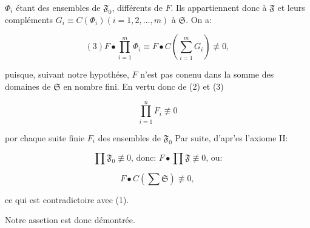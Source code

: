 \documentclass[12pt,french]{article}
\begin{document}
$\Phi_i$ \'etant des ensembles de $\mathfrak{F}_0$, diff\'erents de $F$. Ils appartiennent donc \`a $\mathfrak{F}$ et leurs compl\'ements $G_i \equiv C(\Phi_i) (i=1,2,...,m)$ \`a $\mathfrak{S}$. On a:

$$(3) F \bullet \prod_{i=1}^{m}\Phi_i \equiv F\bullet{}C(\sum_{i=1}^{m}G_i) \not\equiv 0,$$

puisque, suivant notre hypoth\'ese, $F$ n'est pas conenu dans la somme des domaines de $\mathfrak{S}$ en nombre fini. En vertu donc de (2) et (3)

$$\prod_{i=1}^{n}F_i \not\equiv{}0$$

por chaque suite finie $F_i$ des ensembles de $\mathfrak{F}_0$ Par suite, d'apr'es l'axiome II:


$$\prod\mathfrak{F}_0\not\equiv{}0\mbox{, donc: }F\bullet\prod\mathfrak{F}\not\equiv{}0\mbox{, ou:}$$

$$F\bullet{}C(\sum\mathfrak{S})\not\equiv{}0,$$

ce qui est contradictoire avec (1).

Notre assetion est donc d\'emontr\'ee.
\end{document}
